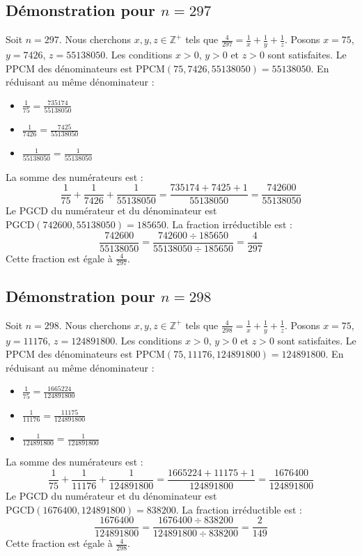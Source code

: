 \documentclass[11pt,a4paper]{article}
\begin{document}
\subsection{Démonstration pour $n = 297$}
Soit $n = 297$. Nous cherchons $x, y, z \in \mathbb{Z}^{+}$ tels que $\frac{4}{297} = \frac{1}{x} + \frac{1}{y} + \frac{1}{z}$.
Posons $x = 75$, $y = 7426$, $z = 55138050$.
Les conditions $x > 0$, $y > 0$ et $z > 0$ sont satisfaites.
Le PPCM des dénominateurs est $\text{PPCM}(75, 7426, 55138050) = 55138050$.
En réduisant au même dénominateur :
\begin{itemize}
    \item $\frac{1}{75} = \frac{735174}{55138050}$
    \item $\frac{1}{7426} = \frac{7425}{55138050}$
    \item $\frac{1}{55138050} = \frac{1}{55138050}$
\end{itemize}
La somme des numérateurs est :
$$ \frac{1}{75} + \frac{1}{7426} + \frac{1}{55138050} = \frac{735174 + 7425 + 1}{55138050} = \frac{742600}{55138050} $$
Le PGCD du numérateur et du dénominateur est $\text{PGCD}(742600, 55138050) = 185650$.
La fraction irréductible est :
$$ \frac{742600}{55138050} = \frac{742600 \div 185650}{55138050 \div 185650} = \frac{4}{297} $$
Cette fraction est égale à $\frac{4}{297}$.

\subsection{Démonstration pour $n = 298$}
Soit $n = 298$. Nous cherchons $x, y, z \in \mathbb{Z}^{+}$ tels que $\frac{4}{298} = \frac{1}{x} + \frac{1}{y} + \frac{1}{z}$.
Posons $x = 75$, $y = 11176$, $z = 124891800$.
Les conditions $x > 0$, $y > 0$ et $z > 0$ sont satisfaites.
Le PPCM des dénominateurs est $\text{PPCM}(75, 11176, 124891800) = 124891800$.
En réduisant au même dénominateur :
\begin{itemize}
    \item $\frac{1}{75} = \frac{1665224}{124891800}$
    \item $\frac{1}{11176} = \frac{11175}{124891800}$
    \item $\frac{1}{124891800} = \frac{1}{124891800}$
\end{itemize}
La somme des numérateurs est :
$$ \frac{1}{75} + \frac{1}{11176} + \frac{1}{124891800} = \frac{1665224 + 11175 + 1}{124891800} = \frac{1676400}{124891800} $$
Le PGCD du numérateur et du dénominateur est $\text{PGCD}(1676400, 124891800) = 838200$.
La fraction irréductible est :
$$ \frac{1676400}{124891800} = \frac{1676400 \div 838200}{124891800 \div 838200} = \frac{2}{149} $$
Cette fraction est égale à $\frac{4}{298}$.
\end{document}
